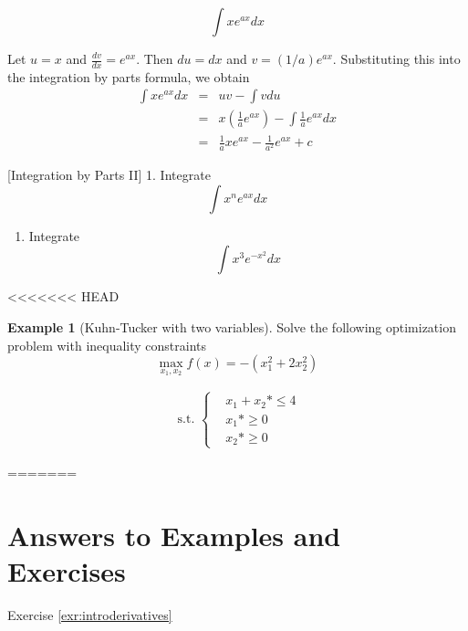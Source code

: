 \documentclass[]{book}
\providecommand{\tightlist}{%
  \setlength{\itemsep}{0pt}\setlength{\parskip}{0pt}}
\theoremstyle{definition}
\theoremstyle{definition}
\newtheorem{example}{Example}[chapter]
\theoremstyle{definition}
\theoremstyle{remark}
\begin{document}
\[\int x e^{ax} dx\]

{}
Let \(u=x\) and \(\frac{dv}{dx} = e^{ax}\). Then \(du=dx\) and \(v=(1/a)e^{ax}\). Substituting this into the integration by parts formula, we obtain\\
\begin{eqnarray}
\int x e^{ax} dx &=& u v - \int v du\nonumber\\
                &=&x\left( \frac{1}{a}e^{ax}\right) -\int\frac{1}{a}e^{ax}dx\nonumber\\
                &=&\frac{1}{a}xe^{ax}-\frac{1}{a^2}e^{ax}+c\nonumber
\end{eqnarray}

[Integration by Parts II]
\protect\hypertarget{exr:intparts-adv}{}{\label{exr:intparts-adv} {} }
1. Integrate
\[\int x^n e^{ax} dx\]

\begin{enumerate}
\def\labelenumi{\arabic{enumi}.}
\setcounter{enumi}{1}
\tightlist
\item
  Integrate
  \[\int x^3 e^{-x^2} dx\]
\end{enumerate}

<<<<<<< HEAD
\begin{example}[Kuhn-Tucker with two variables]
\protect\hypertarget{exm:unnamed-chunk-63}{}{\label{exm:unnamed-chunk-63} {} }Solve the following optimization problem with inequality constraints
\[\max_{x_1,x_2} f(x) = -(x_1^2 + 2x_2^2)\]

\begin{align*}
\text{ s.t. } 
\begin{cases}
&x_1 + x_2 *\le 4\\
&x_1 *\ge 0\\
&x_2 *\ge 0
\end{cases}
\end{align*}
\end{example}
=======
\hypertarget{answers-to-examples-and-exercises-2}{%
\section*{Answers to Examples and Exercises}\label{answers-to-examples-and-exercises-2}}

Exercise \ref{exr:introderivatives}
\end{document}
